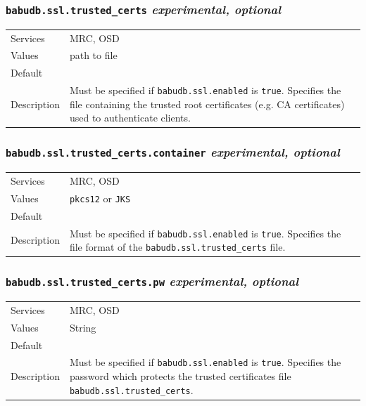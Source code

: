 \documentclass[a4paper,10pt]{book}
\begin{document}
\subsubsection{\texttt{babudb.ssl.trusted\_certs} \textit{experimental, optional}}
\begin{tabular}{lp{10cm}}
 Services & MRC, OSD\\
 Values   & path to file\\
 Default  & \\
 Description & Must be specified if \texttt{babudb.ssl.enabled} is \texttt{true}. Specifies the file containing the trusted root certificates (e.g. CA certificates) used to authenticate clients.
\end{tabular}

\subsubsection{\texttt{babudb.ssl.trusted\_certs.container} \textit{experimental, optional}}
\begin{tabular}{lp{10cm}}
 Services & MRC, OSD\\
 Values   & \texttt{pkcs12} or \texttt{JKS}\\
 Default  & \\
 Description & Must be specified if \texttt{babudb.ssl.enabled} is \texttt{true}. Specifies the file format of the \texttt{babudb.ssl.trusted\_certs} file.
\end{tabular}

\subsubsection{\texttt{babudb.ssl.trusted\_certs.pw} \textit{experimental, optional}}
\begin{tabular}{lp{10cm}}
 Services & MRC, OSD\\
 Values   & String\\
 Default  & \\
 Description & Must be specified if \texttt{babudb.ssl.enabled} is \texttt{true}. Specifies the password which protects the trusted certificates file \texttt{babudb.ssl.trusted\_certs}.
\end{tabular}
\end{document}
